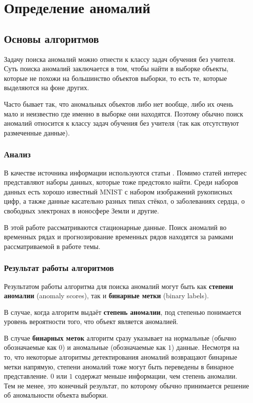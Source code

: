 \chapter{Определение аномалий} \label{ch:ch2}

\section{Основы алгоритмов} \label{sec:ch2/sec1}

Задачу поиска аномалий можно отнести к классу задач обучения без учителя. Суть поиска аномалий заключается в том, чтобы найти в выборке объекты, которые не похожи на большинство объектов выборки, то есть те, которые выделяются на фоне других.

Часто бывает так, что аномальных объектов либо нет вообще, либо их очень мало и неизвестно где именно в выборке они находятся. Поэтому обычно поиск аномалий относится к классу задач обучения без учителя (так как отсутствуют размеченные данные).

\subsection{Анализ}

В качестве источника информации используются статьи \cite{dai, hodge, vakili, varun, billor, wilkinson}. Помимо статей интерес представляют наборы данных, которые тоже предстояло найти. Среди наборов данных есть хорошо известный MNIST с набором изображений рукописных цифр, а также данные касательно разных типах стёкол, о заболеваниях сердца, о свободных электронах в ионосфере Земли и другие.

В этой работе рассматриваются стационарные данные. Поиск аномалий во временных рядах и прогнозирование временных рядов находятся за рамками рассматриваемой в работе темы.

\subsection{Результат работы алгоритмов}

Результатом работы алгоритма для поиска аномалий могут быть как \textbf{степени аномалии} (anomaly scores), так и \textbf{бинарные метки} (binary labels).

В случае, когда алгоритм выдаёт \textbf{степень аномалии}, под степенью понимается уровень вероятности того, что объект является аномалией.

В случае \textbf{бинарных меток} алгоритм сразу указывает на нормальные (обычно обозначаемые как $0$) и аномальные (обозначаемые как $1$) данные. Несмотря на то, что некоторые алгоритмы детектирования аномалий возвращают бинарные метки напрямую, степени аномалий тоже могут быть переведены в бинарное представление. $0$ или $1$ содержат меньше информации, чем степень аномалии. Тем не менее, это конечный результат, по которому обычно принимается решение об аномальности объекта выборки.

